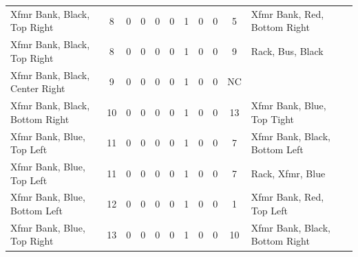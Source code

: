 \begin{table}[!htp]
{\begin{tabular}{lcccccccccll}
			Xfmr Bank, Black, Top Right                         & 8                       & 0                                           & 0                                          & 0           & 0           & 1            & 0                & 0 & 5                            & Xfmr Bank, Red, Bottom Right     &                \\
			Xfmr Bank, Black, Top Right                         & 8                       & 0                                           & 0                                          & 0           & 0           & 1            & 0                & 0 & 9                            & Rack, Bus, Black                 &                \\
			Xfmr Bank, Black, Center Right                      & 9                       & 0                                           & 0                                          & 0           & 0           & 1            & 0                & 0 & NC                           &                                  &                \\
			Xfmr Bank, Black, Bottom Right                      & 10                      & 0                                           & 0                                          & 0           & 0           & 1            & 0                & 0 & 13                           & Xfmr Bank, Blue, Top Tight       &                \\
			Xfmr Bank, Blue, Top Left                           & 11                      & 0                                           & 0                                          & 0           & 0           & 1            & 0                & 0 & 7                            & Xfmr Bank, Black, Bottom Left    &                \\
			Xfmr Bank, Blue, Top Left                           & 11                      & 0                                           & 0                                          & 0           & 0           & 1            & 0                & 0 & 7                            & Rack, Xfmr, Blue                 &                \\
			Xfmr Bank, Blue, Bottom Left                        & 12                      & 0                                           & 0                                          & 0           & 0           & 1            & 0                & 0 & 1                            & Xfmr Bank, Red, Top Left         &                \\
			Xfmr Bank, Blue, Top Right                          & 13                      & 0                                           & 0                                          & 0           & 0           & 1            & 0                & 0 & 10                           & Xfmr Bank, Black, Bottom Right   &                \\

\end{tabular}}
\end{table}
